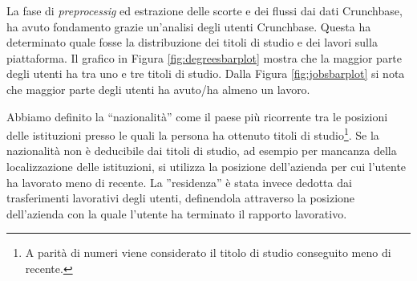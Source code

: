La fase di \textit{preprocessig} ed estrazione delle scorte e dei flussi dai dati Crunchbase, ha avuto fondamento grazie un'analisi degli utenti Crunchbase. Questa ha determinato quale fosse la distribuzione dei titoli di studio e dei lavori sulla piattaforma. 
Il grafico in Figura \ref{fig:degreesbarplot} mostra che la maggior parte degli utenti ha tra uno e tre titoli di studio. 
Dalla Figura \ref{fig:jobsbarplot} si nota che maggior parte degli utenti ha avuto/ha almeno un lavoro.

Abbiamo definito la ``nazionalità'' come il paese più ricorrente tra le posizioni delle istituzioni presso le quali la persona ha ottenuto titoli di studio\footnote{A parità di numeri viene considerato il titolo di studio conseguito meno di recente.}. Se la nazionalità non è deducibile dai titoli di studio, ad esempio per mancanza della localizzazione delle istituzioni, si utilizza la posizione dell'azienda per cui l'utente ha lavorato meno di recente. 
La ''residenza'' è stata invece dedotta dai trasferimenti lavorativi degli utenti, definendola attraverso la posizione dell'azienda con la quale l'utente ha terminato il rapporto lavorativo.
\FloatBarrier

